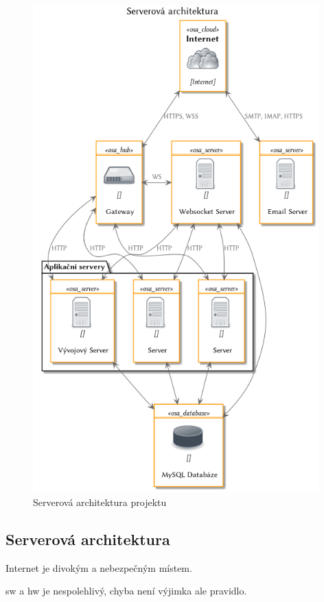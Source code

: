 \begin{figure}[!ht]
\centering
\includegraphics[width=11cm]{img/serverova-architektura.png}
\caption{Serverová architektura projektu \bso{}}
\label{fig:servery}
\end{figure}

\clearpage

\subsection{Serverová architektura}

\emptyLine

\begin{displayquote}
Internet je divokým a nebezpečným místem\cite{internet-is-dangerous-place}.
\end{displayquote}

\begin{displayquote}
\acrlong{sw} a \acrlong{hw} je nespolehlivý, chyba není výjimka ale pravidlo\cite{failure-is-rule-not-exception}.
\end{displayquote}

